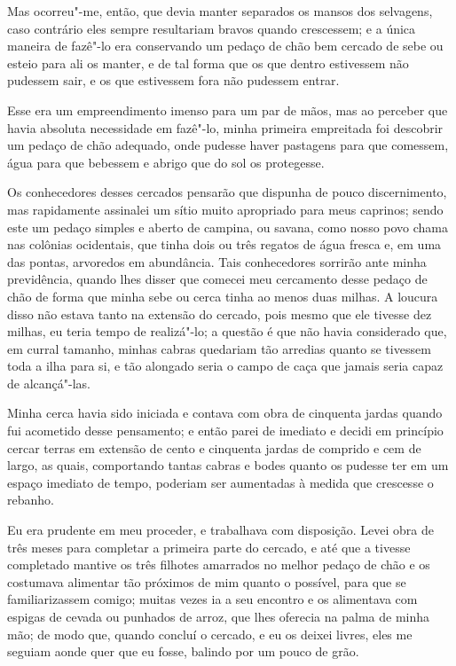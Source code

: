 Mas ocorreu"-me, então, que devia manter separados os mansos dos
selvagens, caso contrário eles sempre resultariam bravos quando
crescessem; e a única maneira de fazê"-lo era conservando um pedaço de
chão bem cercado de sebe ou esteio para ali os manter, e de tal forma
que os que dentro estivessem não pudessem sair, e os que estivessem fora
não pudessem entrar.

Esse era um empreendimento imenso para um par de mãos, mas ao perceber
que havia absoluta necessidade em fazê"-lo, minha primeira empreitada foi
descobrir um pedaço de chão adequado, onde pudesse haver pastagens para
que comessem, água para que bebessem e abrigo que do sol os protegesse.

Os conhecedores desses cercados pensarão que dispunha de pouco
discernimento, mas rapidamente assinalei um sítio muito apropriado para
meus caprinos; sendo este um pedaço simples e aberto de campina, ou
savana, como nosso povo chama nas colônias ocidentais, que tinha dois ou
três regatos de água fresca e, em uma das pontas, arvoredos em
abundância. Tais conhecedores sorrirão ante minha previdência, quando
lhes disser que comecei meu cercamento desse pedaço de chão de forma que
minha sebe ou cerca tinha ao menos duas milhas. A loucura disso não
estava tanto na extensão do cercado, pois mesmo que ele tivesse dez
milhas, eu teria tempo de realizá"-lo; a questão é que não havia
considerado que, em curral tamanho, minhas cabras quedariam tão arredias
quanto se tivessem toda a ilha para si, e tão alongado seria o campo de
caça que jamais seria capaz de alcançá"-las.

Minha cerca havia sido iniciada e contava com obra de cinquenta jardas
quando fui acometido desse pensamento; e então parei de imediato e
decidi em princípio cercar terras em extensão de cento e cinquenta
jardas de comprido e cem de largo, as quais, comportando tantas cabras e
bodes quanto os pudesse ter em um espaço imediato de tempo, poderiam ser
aumentadas à medida que crescesse o rebanho.

Eu era prudente em meu proceder, e trabalhava com disposição. Levei obra
de três meses para completar a primeira parte do cercado, e até que a
tivesse completado mantive os três filhotes amarrados no melhor pedaço
de chão e os costumava alimentar tão próximos de mim quanto o possível,
para que se familiarizassem comigo; muitas vezes ia a seu encontro e os
alimentava com espigas de cevada ou punhados de arroz, que lhes oferecia
na palma de minha mão; de modo que, quando concluí o cercado, e eu os
deixei livres, eles me seguiam aonde quer que eu fosse, balindo por um
pouco de grão.

